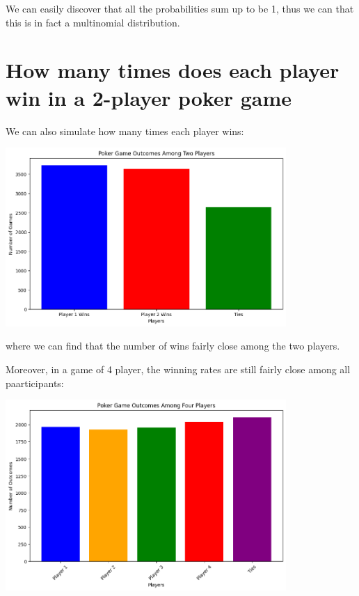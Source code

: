\documentclass{article}
\begin{document}
We can easily discover that all the probabilities sum up to be 1, thus 
we can that this is in fact a multinomial distribution. 




\section*{How many times does each player win in a 2-player poker game}

We can also simulate how many times each player wins:

\begin{center}
    \includegraphics[width = 0.8\textwidth]{images/win_rate_2_player.png}
\end{center}

where we can find that the number of wins fairly close among the 
two players.

Moreover, in a game of 4 player, the winning rates are still fairly close 
among all paarticipants:

\begin{center}
    \includegraphics[width = 0.8\textwidth]{images/win_rate_4_player.png}
\end{center}
\end{document}

